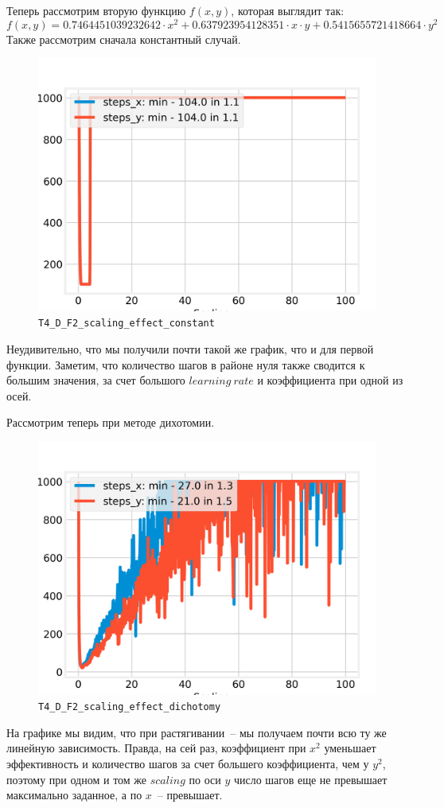 \documentclass[12pt, a4paper, oneside, final]{article}
\begin{document}
	Теперь рассмотрим вторую функцию $f(x, y)$, которая выглядит так:
	\[
		f(x, y) = 0.7464451039232642 \cdot x^{2} + 0.637923954128351 \cdot x \cdot y + 0.5415655721418664 \cdot y^{2}
	\]
	Также рассмотрим сначала константный случай.
	\begin{figure}[H]
		\centering
		\includegraphics[scale=0.68]{Image/T4_D_F2_scaling_effect_constant.png}
		\caption*{\texttt{T4\_D\_F2\_scaling\_effect\_constant}}
	\end{figure}
	Неудивительно, что мы получили почти такой же график, что и для первой функции. Заметим, что количество шагов в районе нуля также сводится к большим значения, за счет большого $learning~rate$ и коэффициента при одной из осей.

	Рассмотрим теперь при методе дихотомии.
	\begin{figure}[H]
		\centering
		\includegraphics[scale=0.68]{Image/T4_D_F2_scaling_effect_dichotomy.png}
		\caption*{\texttt{T4\_D\_F2\_scaling\_effect\_dichotomy}}
	\end{figure}
	На графике мы видим, что при растягивании~-- мы получаем почти всю ту же линейную зависимость. Правда, на сей раз, коэффициент при $x^2$ уменьшает эффективность и количество шагов за счет большего коэффициента, чем у $y^2$, поэтому при одном и том же $scaling$ по оси $y$ число шагов еще не превышает максимально заданное, а по $x$~-- превышает.
\end{document}
